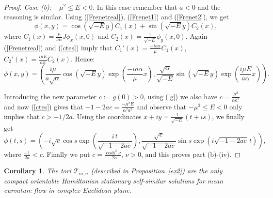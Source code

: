 \documentclass[leqno,11pt]{amsart}
\newtheorem{corollary}{Corollary}
\begin{document}
\begin{proof}
{\em Case (b): $-\mu^2 \leq E <0$.} In this case remember that
$a<0$ and the reasoning is similar. Using (\ref{Frenetreal}),
(\ref{Frenet1}) and (\ref{Frenet2}), we get
$$ \phi(x,y)= \cos (\sqrt{-E}y)C_1(x)+\sin (\sqrt{-E}y)C_2(x),$$
where $C_1(x)=\frac{\mu}{a \alpha}J\phi_x(x,0)$ and
$C_2(x)=\frac{1}{\sqrt{-E}}\phi_y(x,0)$. 
Again (\ref{Frenetreal}) and (\ref{ctes}) imply that
$C_1'(x)=\frac{-ia\alpha}{\mu}C_1(x)$, $C_2'(x)=\frac{i \mu E}{a
\alpha}C_2(x)$. Hence:
$$ \phi (x,y)=\left(  \frac{i\mu}{a \sqrt{\alpha}} \cos (\sqrt{-E}y) \exp \left(\frac{-i a \alpha}{\mu}x \right),
\frac{\sqrt{\alpha}}{\sqrt{-E}} \sin (\sqrt{-E}y) \exp
\left(\frac{i \mu E}{a \alpha }x\right)\right). $$

Introducing the new parameter $c:=g(0)>0$, using (\ref{g}) we also
have $c=\frac{\mu^2}{\alpha a^2}$ and now (\ref{ctes}) gives that
$-1-2ac = \frac{-\mu^2 E}{\alpha^2 a^2}$ and  observe that $-\mu^2
\leq E <0$  only implies that $c>-1/2a$. Using the coordinates
$x+iy=\frac{1}{\sqrt{-E}}(t+is)$, we finally get
$$ \phi(t,s)=\left(-i\sqrt{c}\cos
s\exp\left(\frac{i\,t}{\sqrt{-\!1-\!2ac}}\right),\frac{\sqrt{c}}{\sqrt{-\!1-\!2ac}}\sin
s\exp\left(i\sqrt{-\!1-\!2ac}\,t\right)\right), $$ where
$\frac{-1}{2a}<c$. Finally we put $c=\frac{\cosh^2 \nu}{-2a}$,
$\nu >0$, and this proves part (b)-(iv).
\end{proof}

\begin{corollary}
The tori $\mathcal{T}_{m,n}$ (described in Proposition~\ref{ex2})
are the only compact orientable Hamiltonian stationary
self-similar solutions for mean curvature flow in complex
Euclidean plane.
\end{corollary}
\end{document}
